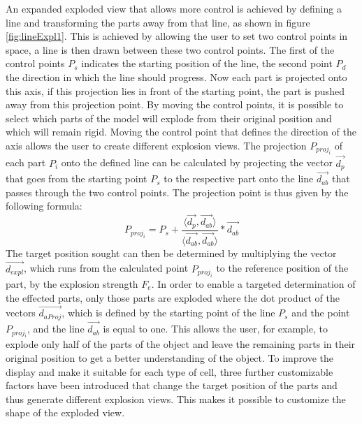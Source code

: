 An expanded exploded view that allows more control is achieved by defining a line and transforming the parts away from that line, as shown in figure \ref{fig:lineExpl1}.
This is achieved by allowing the user to set two control points in space, a line is then drawn between these two control points. 
The first of the control points $P_s$ indicates the starting position of the line, the second point $P_d$ the direction in which the line should progress. 
Now each part is projected onto this axis, if this projection lies in front of the starting point, the part is pushed away from this projection point. 
By moving the control points, it is possible to select which parts of the model will explode from their original position and which will remain rigid. 
Moving the control point that defines the direction of the axis allows the user to create different explosion views.
The projection $P_{proj_i}$ of each part $P_i$ onto the defined line can be calculated by projecting the vector $\vec{d_p}$ that goes from the starting point $P_s$ to the respective part onto the line $\vec{d_{ab}}$ that passes through the two control points. 
The projection point is thus given by the following formula:
\begin{equation}
	P_{proj_i} = P_s + \frac{\langle\vec{d_p},\vec{d_{ab}}\rangle}{\langle\vec{d_{ab}},\vec{d_{ab}}\rangle} * \vec{d_{ab}}
	\label{eq:LineProj}
\end{equation}
The target position sought can then be determined by multiplying the vector $\vec{d_{expl}}$, which runs from the calculated point $P_{proj_i}$ to the reference position of the part, by the explosion strength $F_e$.
In order to enable a targeted determination of the effected parts, only those parts are exploded where the dot product of the vectors $\vec{d_{aProj}}$, which is defined by the starting point of the line $P_s$ and the point $P_{proj_i}$, and the line $\vec{d_{ab}}$ is equal to one.
This allows the user, for example, to explode only half of the parts of the object and leave the remaining parts in their original position to get a better understanding of the object. 
To improve the display and make it suitable for each type of cell, three further customizable factors have been introduced that change the target position of the parts and thus generate different explosion views. 
This makes it possible to customize the shape of the exploded view.
